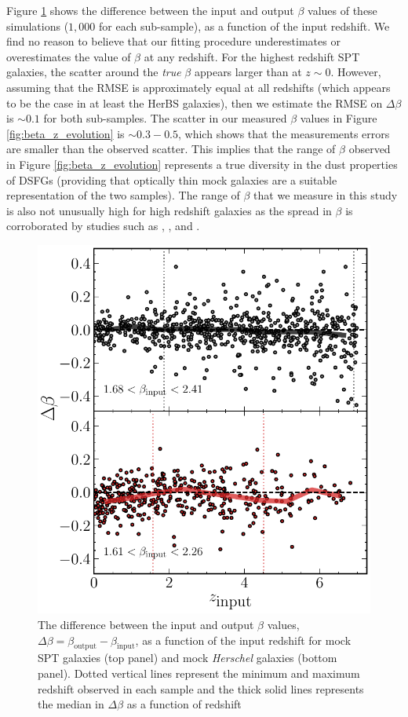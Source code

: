 Figure \ref{fig:beta_z_simulation} shows the difference between the input and output $\beta$ values of these simulations ($1,000$ for each sub-sample), as a function of the input redshift. We find no reason to believe that our fitting procedure underestimates or overestimates the value of $\beta$ at any redshift. For the highest redshift SPT galaxies, the scatter around the \textit{true} $\beta$ appears larger than at $z \sim 0$. However, assuming that the RMSE is approximately equal at all redshifts (which appears to be the case in at least the HerBS galaxies), then we estimate the RMSE on $\Delta \beta$ is $\sim 0.1$ for both sub-samples. The scatter in our measured $\beta$ values in Figure \ref{fig:beta_z_evolution} is $\sim 0.3 - 0.5$, which shows that the measurements errors are smaller than the observed scatter. This implies that the range of $\beta$ observed in Figure \ref{fig:beta_z_evolution} represents a true diversity in the dust properties of DSFGs (providing that optically thin mock galaxies are a suitable representation of the two samples). The range of $\beta$ that we measure in this study is also not unusually high for high redshift galaxies as the spread in $\beta$ is corroborated by studies such as \citealt{daCunha_2021}, \citealt{Cooper_2022}, \citealt{Ismail_2023} and \citealt{Witstok_2023}.

\begin{figure}
	\centering
	\includegraphics[width=0.74\columnwidth]{figures/Figure_4_10.pdf}
	\caption[Difference between input and output $\beta$ from simulations of mock galaxies]{The difference between the input and output $\beta$ values, $\Delta \beta = \beta_{\textrm{output}} - \beta_{\textrm{input}}$, as a function of the input redshift for mock SPT galaxies (top panel) and mock \textit{Herschel} galaxies (bottom panel). Dotted vertical lines represent the minimum and maximum redshift observed in each sample and the thick solid lines represents the median in $\Delta \beta$ as a function of redshift}
	\label{fig:beta_z_simulation}
\end{figure}

